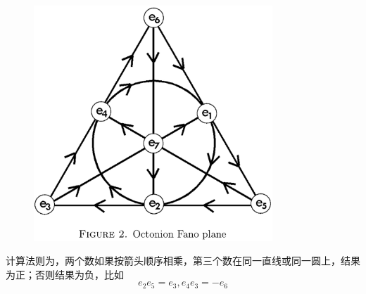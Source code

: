 \documentclass[hpyerref,UTF8,a4paper,titlepage,12pt,oneside]{ctexbook}
\theoremstyle{definition}
\begin{document}
	\begin{figure}[H]
		\begin{center}
			\includegraphics[width=0.8\textwidth]{./images/octnions.png}
		\end{center}
	\end{figure}

	计算法则为，两个数如果按箭头顺序相乘，第三个数在同一直线或同一圆上，结果为正；否则结果为负，比如
	$$
		e_2e_5 = e_3,e_4e_3 = -e_6
	$$

\end{document}

